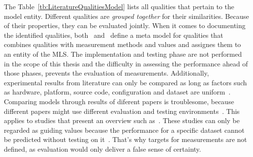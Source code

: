 The Table~\ref{tb:LiteratureQualitiesModel} lists all qualities that pertain to the model entity.
Different qualities are \textit{grouped together} for their similarities.
Because of their properties, they can be evaluated jointly.
When it comes to documenting the identified qualities,
both~\cite{nakamichi_requirements-driven_2020} and~\cite{siebert_construction_2021} define a meta
model for qualities that combines qualities with
measurement methods and values and assignes them to an entity of the \ac{MLS}.
The implementation and testing phase are not performed in the scope of this thesis and the
difficulty in assessing the performance ahead of those phases, prevents the evaluation
of measurements.
Additionally, experimental results from literature can only be compared as long as factors such as
hardware, platform, source code, configuration and dataset are uniform~\citep{arpteg_software_2018}.
Comparing models through results of diferent papers is troublesome, because different papers
might use different evaluation and testing environments~\citep{baek_what_2019}.
This applies to studies that present an overview such as~\cite{chen_text_2021,long_scene_2021}.
These studies can only be regarded as guiding values because the performance for a specific dataset
cannot be predicted without testing on it~\citep{arpteg_software_2018}.
That's why targets for measurements are not defined, as evaluation would only deliver a false
sense of certainty.

